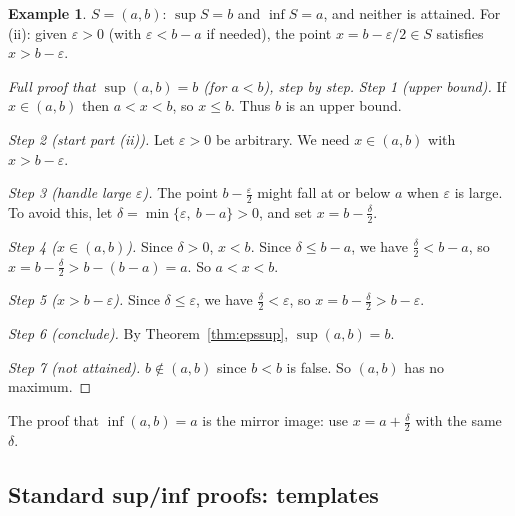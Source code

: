 \documentclass[11pt]{article}
\theoremstyle{definition}
\newtheorem{ex}[defn]{Example}
\newcommand{\eps}{\varepsilon}
\begin{document}
\begin{ex}
$S=(a,b)$: $\sup S=b$ and $\inf S=a$, and neither is attained. For (ii):
given $\eps>0$ (with $\eps<b-a$ if needed), the point
$x=b-\eps/2\in S$ satisfies $x>b-\eps$.

\begin{proof}[Full proof that $\sup(a,b)=b$ (for $a<b$), step by step]
\emph{Step 1 (upper bound).} If $x\in(a,b)$ then $a<x<b$, so $x\le b$.
Thus $b$ is an upper bound.

\emph{Step 2 (start part (ii)).} Let $\eps>0$ be arbitrary. We need
$x\in(a,b)$ with $x>b-\eps$.

\emph{Step 3 (handle large $\eps$).} The point $b-\frac\eps2$ might fall
at or below $a$ when $\eps$ is large. To avoid this, let
$\delta=\min\{\eps,\ b-a\}>0$, and set $x=b-\frac\delta2$.

\emph{Step 4 ($x\in(a,b)$).} Since $\delta>0$, $x<b$. Since
$\delta\le b-a$, we have $\frac\delta2<b-a$, so $x=b-\frac\delta2>b-(b-a)=a$.
So $a<x<b$.

\emph{Step 5 ($x>b-\eps$).} Since $\delta\le\eps$, we have
$\frac\delta2<\eps$, so $x=b-\frac\delta2>b-\eps$.

\emph{Step 6 (conclude).} By Theorem~\ref{thm:epssup}, $\sup(a,b)=b$.

\emph{Step 7 (not attained).} $b\notin(a,b)$ since $b<b$ is false. So
$(a,b)$ has no maximum.
\end{proof}
The proof that $\inf(a,b)=a$ is the mirror image: use
$x=a+\frac\delta2$ with the same $\delta$.
\end{ex}

\subsection{Standard sup/inf proofs: templates}
\end{document}
